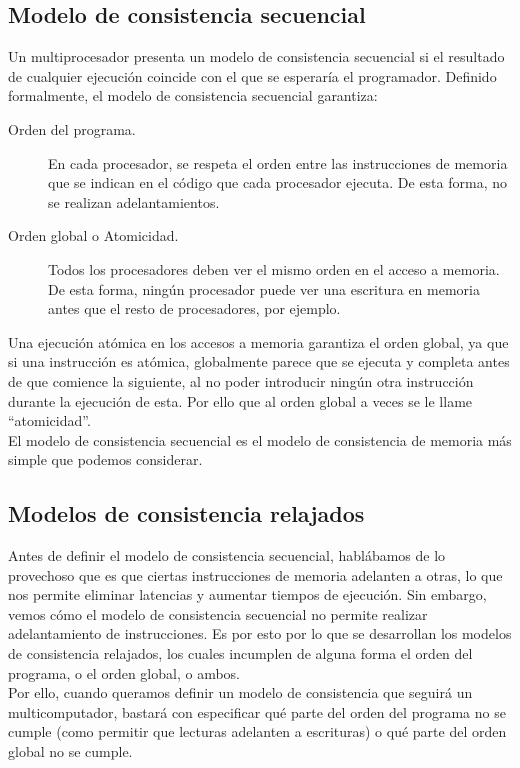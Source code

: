 \subsection{Modelo de consistencia secuencial}
Un multiprocesador presenta un modelo de consistencia secuencial si el resultado de cualquier ejecución coincide con el que se esperaría el programador. Definido formalmente, el modelo de consistencia secuencial garantiza: 
\begin{description}
    \item [Orden del programa.] En cada procesador, se respeta el orden entre las instrucciones de memoria que se indican en el código que cada procesador ejecuta. De esta forma, no se realizan adelantamientos.
    \item [Orden global o Atomicidad.] Todos los procesadores deben ver el mismo orden en el acceso a memoria. De esta forma, ningún procesador puede ver una escritura en memoria antes que el resto de procesadores, por ejemplo.
\end{description}
Una ejecución atómica en los accesos a memoria garantiza el orden global, ya que si una instrucción es atómica, globalmente parece que se ejecuta y completa antes de que comience la siguiente, al no poder introducir ningún otra instrucción durante la ejecución de esta. Por ello que al orden global a veces se le llame ``atomicidad''.\\

El modelo de consistencia secuencial es el modelo de consistencia de memoria más simple que podemos considerar.

\subsection{Modelos de consistencia relajados}
Antes de definir el modelo de consistencia secuencial, hablábamos de lo provechoso que es que ciertas instrucciones de memoria adelanten a otras, lo que nos permite eliminar latencias y aumentar tiempos de ejecución. Sin embargo, vemos cómo el modelo de consistencia secuencial no permite realizar adelantamiento de instrucciones. Es por esto por lo que se desarrollan los modelos de consistencia relajados, los cuales incumplen de alguna forma el orden del programa, o el orden global, o ambos.\\

Por ello, cuando queramos definir un modelo de consistencia que seguirá un multicomputador, bastará con especificar qué parte del orden del programa no se cumple (como permitir que lecturas adelanten a escrituras) o qué parte del orden global no se cumple.\\

